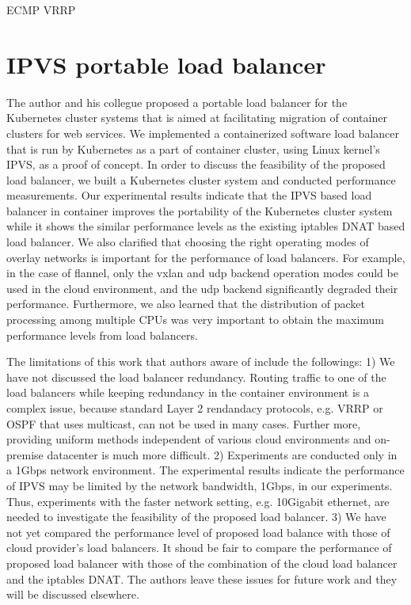 ECMP  VRRP


\section{IPVS portable load balancer}\label{IPVS}

The author and his collegue proposed a portable load balancer for the Kubernetes cluster systems 
that is aimed at facilitating migration of container clusters for web services.
We implemented a containerized software load balancer that is run by Kubernetes as a part of container cluster, 
using Linux kernel's IPVS, as a proof of concept.
In order to discuss the feasibility of the proposed load balancer, we built 
a Kubernetes cluster system and conducted performance measurements.
Our experimental results indicate that the IPVS based load balancer in container improves the portability of 
the Kubernetes cluster system while it shows the similar performance levels as the existing iptables DNAT based load balancer.
We also clarified that choosing the right operating modes of overlay networks is important for the performance of load balancers. 
For example, in the case of flannel, only the vxlan and udp backend operation modes could be used 
in the cloud environment, and the udp backend significantly degraded their performance.
Furthermore, we also learned that the distribution of packet processing among multiple CPUs was very important
to obtain the maximum performance levels from load balancers.
%

The limitations of this work that authors aware of include the followings: 
1) We have not discussed the load balancer redundancy. 
Routing traffic to one of the load balancers while keeping redundancy in the container environment is a complex issue,
because standard Layer 2 rendandacy protocols, e.g. VRRP or OSPF\cite{moy1997ospf} that uses multicast, can not be used in many cases.
Further more, providing uniform methods independent of various cloud environments and on-premise datacenter is much more difficult.   
2) Experiments are conducted only in a 1Gbps network environment.
The experimental results indicate the performance of IPVS may be limited by the network bandwidth, 1Gbps, in our experiments. 
Thus, experiments with the faster network setting, e.g. 10Gigabit ethernet, are needed to investigate the feasibility of the proposed load balancer.
3) We have not yet compared the performance level of proposed load balance with those of cloud provider's load balancers.
It shoud be fair to compare the performance of proposed load balancer with those of the combination of the cloud load balancer and the iptables DNAT. 
The authors leave these issues for future work and they will be discussed elsewhere.


